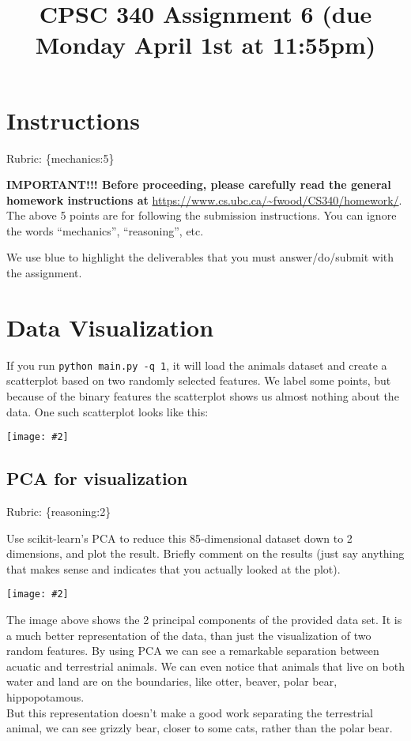 \documentclass{article}
\def\rubric#1{\gre{Rubric: \{#1\}}}{}
\def\blu#1{{\color{blu}#1}}
\def\gre#1{{\color{gre}#1}}
\def\ans#1{{\color{ans}#1}}
\newcommand{\centerfig}[2]{\begin{center}\texttt{[image: \#2]}\end{center}}
\begin{document}
\title{CPSC 340 Assignment 6 (due Monday April 1st at 11:55pm)}
\date{}
\maketitle

\vspace{-7em}


\section*{Instructions}
\rubric{mechanics:5}

\textbf{IMPORTANT!!! Before proceeding, please carefully read the general homework instructions at} \url{https://www.cs.ubc.ca/~fwood/CS340/homework/}. The above 5 points are for following the submission instructions. You can ignore the words ``mechanics'', ``reasoning'', etc.

\vspace{1em}
We use \blu{blue} to highlight the deliverables that you must answer/do/submit with the assignment.

\section{Data Visualization}

If you run \verb|python main.py -q 1|, it will load the animals dataset and create a scatterplot based on two randomly selected features.
We label some points, but because of the binary features the scatterplot shows us almost nothing about the data. One such scatterplot looks like this:

\centerfig{.5}{../figs/two_random_features.png}

\subsection{PCA for visualization}
\rubric{reasoning:2}

Use scikit-learn's PCA to reduce this 85-dimensional dataset down to 2 dimensions, and plot the result. Briefly comment on the results (just say anything that makes sense and indicates that you actually looked at the plot).
\centerfig{.5}{../figs/pca_2_features.png}
\ans{
    The image above shows the 2 principal components of the provided data set. It is a much better representation of the data, 
    than just the visualization of two random features. By using PCA we can see a remarkable separation between acuatic and 
    terrestrial animals. We can even notice that animals that live on both water and land are on the boundaries, like otter, 
    beaver, polar bear, hippopotamous. \\ 
    But this representation doesn't make a good work separating the terrestrial animal, we can see grizzly bear, closer to 
    some cats, rather than the polar bear.
}
\end{document}
